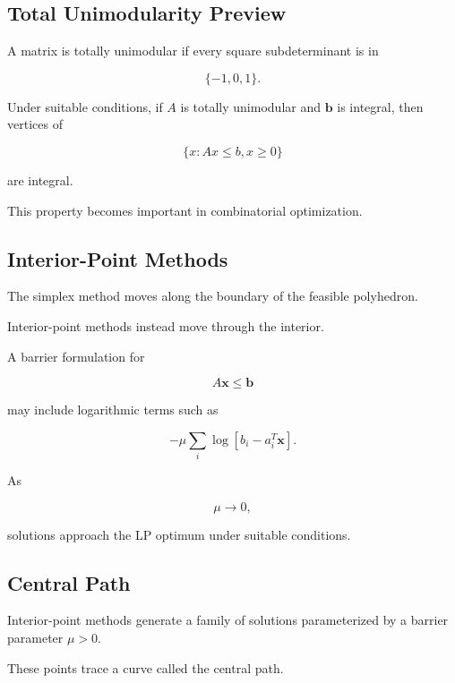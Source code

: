 \subsection{Total Unimodularity Preview}
\label{subsec:total-unimodularity-preview}

A matrix is totally unimodular if every square subdeterminant is in

\[
\boxed{
\{-1,0,1\}.
}
\]

Under suitable conditions, if \(A\) is totally unimodular and
\(\mathbf{b}\) is integral, then vertices of

\[
\{
x:
Ax\leq b,
x\geq0
\}
\]

are integral.

This property becomes important in combinatorial optimization.

\subsection{Interior-Point Methods}
\label{subsec:lp-interior-point-methods}

The simplex method moves along the boundary of the feasible polyhedron.

Interior-point methods instead move through the interior.

A barrier formulation for

\[
A\mathbf{x}\leq\mathbf{b}
\]

may include logarithmic terms such as

\[
\boxed{
-\mu
\sum_i
\log
[
b_i-a_i^T\mathbf{x}
].
}
\]

As

\[
\mu\to0,
\]

solutions approach the LP optimum under suitable conditions.

\subsection{Central Path}
\label{subsec:lp-central-path}

Interior-point methods generate a family of solutions parameterized by a
barrier parameter \(\mu>0\).

These points trace a curve called the central path.

